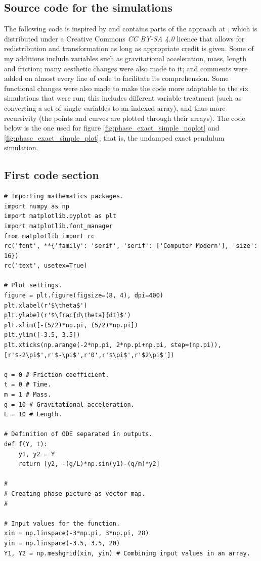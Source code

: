\documentclass[12pt, a4paper, titlepage]{article}
\theoremstyle{definition}
\numberwithin{equation}{section}
\theoremstyle{definition}
\theoremstyle{definition}
\begin{document}
\newpage
\printbibliography
\newpage
\begin{appendices}
\section{Source code for the simulations} \label{sec:app1}
The following code is inspired by and contains parts of the approach at {\parencite{kitchen}}, which is distributed under a Creative Commons \textit{CC BY-SA 4.0} licence that allows for redistribution and transformation as long as appropriate credit is given. Some of my additions include variables such as gravitational acceleration, mass, length and friction; many aesthetic changes were also made to it; and comments were added on almost every line of code to facilitate its comprehension. Some functional changes were also made to make the code more adaptable to the six simulations that were run; this includes different variable treatment (such as converting a set of single variables to an indexed array), and thus more recursivity (the points and curves are plotted through their arrays).  The code below is the one used for figure \ref{fig:phase_exact_simple_noplot} and \ref{fig:phase_exact_simple_plot}, that is, the undamped exact pendulum simulation.

\subsection{First code section}
\begin{lstlisting}
# Importing mathematics packages.
import numpy as np
import matplotlib.pyplot as plt
import matplotlib.font_manager
from matplotlib import rc
rc('font', **{'family': 'serif', 'serif': ['Computer Modern'], 'size': 16})
rc('text', usetex=True)

# Plot settings.
figure = plt.figure(figsize=(8, 4), dpi=400)
plt.xlabel(r'$\theta$')
plt.ylabel(r'$\frac{d\theta}{dt}$')
plt.xlim([-(5/2)*np.pi, (5/2)*np.pi])
plt.ylim([-3.5, 3.5])
plt.xticks(np.arange(-2*np.pi, 2*np.pi+np.pi, step=(np.pi)), [r'$-2\pi$',r'$-\pi$',r'0',r'$\pi$',r'$2\pi$'])

q = 0 # Friction coefficient.
t = 0 # Time.
m = 1 # Mass.
g = 10 # Gravitational acceleration.
L = 10 # Length.

# Definition of ODE separated in outputs.
def f(Y, t):
    y1, y2 = Y
    return [y2, -(g/L)*np.sin(y1)-(q/m)*y2]

#
# Creating phase picture as vector map.
#

# Input values for the function.
xin = np.linspace(-3*np.pi, 3*np.pi, 28)
yin = np.linspace(-3.5, 3.5, 20)
Y1, Y2 = np.meshgrid(xin, yin) # Combining input values in an array.


\end{lstlisting}
\end{appendices}
\end{document}
